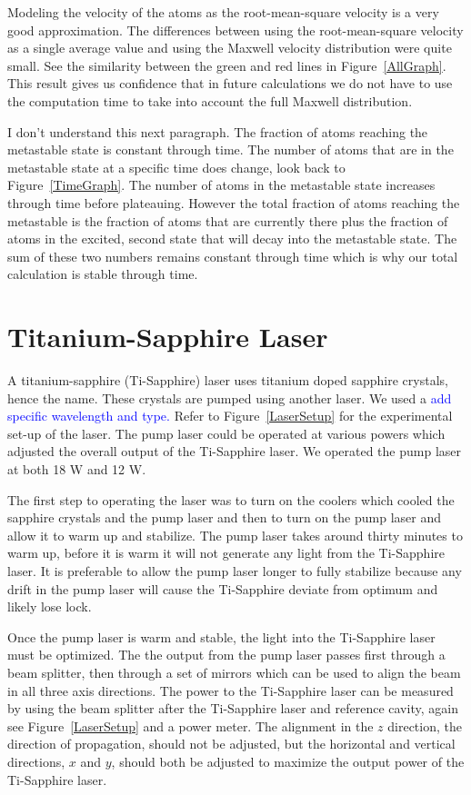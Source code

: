 \documentclass[prb,preprint]{revtex4-1}
\begin{document}
Modeling the velocity of the atoms as the root-mean-square velocity is a very good approximation. The differences between using the root-mean-square velocity as a single average value and using the Maxwell velocity distribution were quite small. See the similarity between the green and red lines in Figure~\ref{AllGraph}.  This result gives us confidence that in future calculations we do not have to use the computation time to take into account the full Maxwell distribution.

I don't understand this next paragraph.
The fraction of atoms reaching the metastable state is constant through time. The number of atoms that are in the metastable state at a specific time does change, look back to Figure~\ref{TimeGraph}. The number of atoms in the metastable state increases through time before plateauing. However the total fraction of atoms reaching the metastable is the fraction of atoms that are currently there plus the fraction of atoms in the excited, second state that will decay into the metastable state. The sum of these two numbers remains constant through time which is why our total calculation is stable through time.
  

\section{Titanium-Sapphire Laser}

A titanium-sapphire (Ti-Sapphire) laser uses titanium doped sapphire crystals, hence the name. These crystals are pumped using another laser. We used a \textcolor{blue}{add specific wavelength and type.} Refer to Figure~\ref{LaserSetup} for the experimental set-up of the laser. The pump laser could be operated at various powers which adjusted the overall output of the Ti-Sapphire laser. We operated the pump laser at both 18 W and 12 W.

The first step to operating the laser was to turn on the coolers which cooled the sapphire crystals and the pump laser and then to turn on the pump laser and allow it to warm up and stabilize. The pump laser takes around thirty minutes to warm up, before it is warm it will not generate any light from the Ti-Sapphire laser. It is preferable to allow the pump laser longer to fully stabilize because any drift in the pump laser will cause the Ti-Sapphire deviate from optimum and likely lose lock.

Once the pump laser is warm and stable, the light into the Ti-Sapphire laser must be optimized. The the output from the pump laser passes first through a beam splitter, then through a set of mirrors which can be used to align the beam in all three axis directions. The power to the Ti-Sapphire laser can be measured by using the beam splitter after the Ti-Sapphire laser and reference cavity, again see Figure~\ref{LaserSetup} and a power meter. The alignment in the $z$ direction, the direction of propagation, should not be adjusted, but the horizontal and vertical directions, $x$ and $y$, should both be adjusted to maximize the output power of the Ti-Sapphire laser. 
\end{document}
